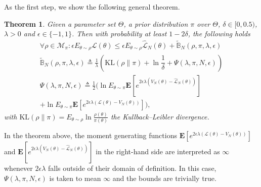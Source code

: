 \documentclass{article}
\newcommand{\KL}{\mathrm{KL}}
\renewcommand{\KL}{\mathrm{KL}}
\newtheorem{theorem}{Theorem}[section]
\newcommand{\bE}{\mathbf{E}}
\begin{document}
As the first step, we show the following general theorem.
\begin{theorem}%
\label{thm:initial}
    Given a parameter set $\Theta$, a prior distribution $\pi$ over $\Theta$, $\delta\in[0,0.5)$, $\lambda>0$ and $\epsilon \in \{-1,1\}$. Then with probability at least $1-2\delta$, the following holds
    \begin{align}
        \forall \rho\in \mathcal{M}_\pi:\epsilon E_{\theta\sim\rho} \mathcal{L}(\theta)
        \leq \epsilon E_{\theta\sim\rho}\hat{\mathcal{L}}_N(\theta) +        
        \tilde{\mathbb{B}}_N(\rho,\pi,\lambda,\epsilon) \label{eq:initial:tildern} \\
    \tilde{\mathbb{B}}_N(\rho,\pi,\lambda,\epsilon)
        \triangleq \frac{1}{\lambda}\left ( \KL(\rho\|\pi) + \ln\dfrac{1}{\delta} + \Psi(\lambda,\pi,N,\epsilon)\right ) \label{eq:initial:def:tildern} \\
        \Psi(\lambda,\pi,N,\epsilon)\triangleq \frac{1}{2} \Big (\ln E_{\theta\sim\pi}\bE[e^{2\epsilon\lambda(V_N(\theta)-\hat{\mathcal{L}}_N(\theta))}] \nonumber \\
        +\ln E_{\theta\sim\pi}\bE[e^{2\epsilon\lambda (\mathcal{L}(\theta)-V_N(\theta))}] \Big ),\label{eq:Psi:initial}
    \end{align}
    with $\KL(\rho\|\pi)=E_{\theta\sim\rho}\ln\frac{\rho(\theta)}{\pi(\theta)}$ the Kullback–Leibler divergence. 
\end{theorem}
In the theorem above, the moment generating functions 
$\bE[e^{2\epsilon\lambda (\mathcal{L}(\theta)-V_N(\theta))}]$ and  $\bE[e^{2\epsilon\lambda(V_N(\theta)-\hat{\mathcal{L}}_N(\theta))}]$
in the right-hand side are interpreted as $\infty$ whenever $2\epsilon \lambda$ falls outside of their domain of definition. In this case, $\Psi(\lambda,\pi,N,\epsilon)$ is taken to mean $\infty$ and  the bounds are trivially true. 
\end{document}

